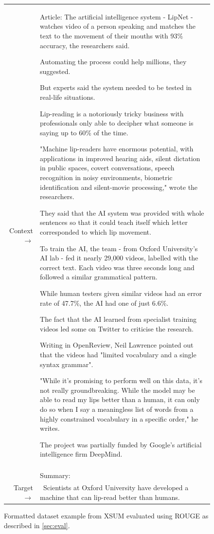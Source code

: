 \documentclass{article}
\begin{document}
\begin{figure}[!h] { \tt \footnotesize \begin{tabularx}{\linewidth}{r X} \toprule Context $\to$ & Article: The artificial intelligence system - LipNet - watches video of a person speaking and matches the text to the movement of their mouths with 93\% accuracy, the researchers said.

Automating the process could help millions, they suggested.

But experts said the system needed to be tested in real-life situations.

Lip-reading is a notoriously tricky business with professionals only able to decipher what someone is saying up to 60\% of the time.

"Machine lip-readers have enormous potential, with applications in improved hearing aids, silent dictation in public spaces, covert conversations, speech recognition in noisy environments, biometric identification and silent-movie processing," wrote the researchers.

They said that the AI system was provided with whole sentences so that it could teach itself which letter corresponded to which lip movement.

To train the AI, the team - from Oxford University's AI lab - fed it nearly 29,000 videos, labelled with the correct text. Each video was three seconds long and followed a similar grammatical pattern.

While human testers given similar videos had an error rate of 47.7\%, the AI had one of just 6.6\%.

The fact that the AI learned from specialist training videos led some on Twitter to criticise the research.

Writing in OpenReview, Neil Lawrence pointed out that the videos had "limited vocabulary and a single syntax grammar".

"While it's promising to perform well on this data, it's not really groundbreaking. While the model may be able to read my lips better than a human, it can only do so when I say a meaningless list of words from a highly constrained vocabulary in a specific order," he writes.

The project was partially funded by Google's artificial intelligence firm DeepMind. \\
& \\
& Summary:\\
\midrule 
Target $\to$ & ~Scientists at Oxford University have developed a machine that can lip-read better than humans.\\
\bottomrule \end{tabularx} }
\caption{Formatted dataset example from XSUM evaluated using ROUGE as described in \autoref{sec:eval}.}  
\label{eval:xsum}  
\end{figure}
\end{document}

